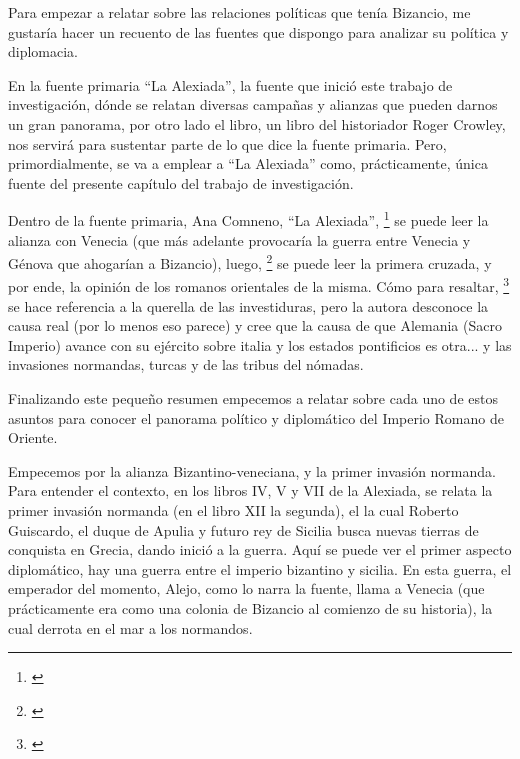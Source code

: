 Para empezar a relatar sobre las relaciones políticas que tenía Bizancio,
me gustaría hacer un recuento de las fuentes que dispongo para analizar
su política y diplomacia.

En la fuente primaria “La Alexiada”, 
la fuente que inició este trabajo de investigación, 
dónde se relatan diversas campañas y alianzas 
que pueden darnos un gran panorama, 
por otro lado el libro, un libro del historiador Roger Crowley, 
nos servirá para sustentar parte de lo que dice la fuente primaria. 
Pero, primordialmente, 
se va a emplear a “La Alexiada” como, prácticamente, 
única fuente del presente capítulo del trabajo de investigación.

Dentro de la fuente primaria,  Ana Comneno, “La Alexiada”,
\footnote{\cite[]{alexiadaVI}}
se puede leer la alianza con Venecia (que más adelante provocaría 
la guerra entre Venecia y Génova que ahogarían a Bizancio), luego,
\footnote{\cite[pp.~419--460]{alexiadaX}}
se puede leer la 
primera cruzada, y por ende, la opinión de los romanos 
orientales de la misma. Cómo para resaltar,
\footnote{\cite[]{alexiadaV}}
se hace referencia a la querella de las investiduras, 
pero la autora desconoce la causa real (por lo menos eso parece) 
y cree que la causa de que Alemania (Sacro Imperio)
avance con su ejército sobre italia y los estados
pontificios es otra...
y las invasiones normandas, 
turcas y de las tribus del nómadas. 

Finalizando este pequeño resumen empecemos a 
relatar sobre cada uno de estos asuntos para conocer el 
panorama político y diplomático del Imperio Romano de Oriente.

Empecemos por la alianza Bizantino-veneciana, y la primer 
invasión normanda. Para entender el contexto, en los libros 
IV, V y VII de la Alexiada, se relata la primer invasión normanda 
(en el libro XII la segunda), el la cual Roberto Guiscardo, 
el duque de Apulia y futuro rey de Sicilia busca nuevas tierras de 
conquista en Grecia, dando inició a la guerra. Aquí se puede ver el 
primer aspecto diplomático, hay una guerra entre el imperio bizantino 
y sicilia. En esta guerra, el emperador del momento, Alejo, 
como lo narra la fuente, llama a Venecia (que prácticamente 
era como una colonia de Bizancio al comienzo de su historia), 
la cual derrota en el mar a los normandos.

